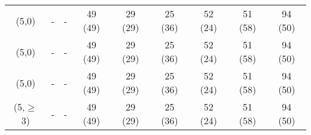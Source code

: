 \begin{table}[h!]
\begin{tabular}{ ccccccccc }
    (5,0)       & -        & -       & 49 (49) & 29 (29) & 25 (36) & 52 (24) & 51 (58)  & 94   (50) \\
    (5,0)       & -        & -       & 49 (49) & 29 (29) & 25 (36) & 52 (24) & 51 (58)  & 94   (50) \\
    (5,0)       & -        & -       & 49 (49) & 29 (29) & 25 (36) & 52 (24) & 51 (58)  & 94   (50) \\
    (5,$\geq$3) & -        & -       & 49 (49) & 29 (29) & 25 (36) & 52 (24) & 51 (58)  & 94   (50) \\
    \hline
    \hline
  \end{tabular}
\end{table}

